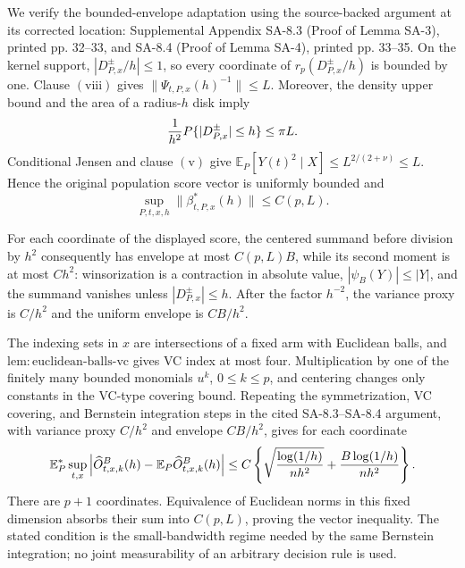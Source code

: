 We verify the bounded-envelope adaptation using the source-backed argument at its corrected location: Supplemental Appendix SA-8.3 (Proof of Lemma SA-3), printed pp. 32--33, and SA-8.4 (Proof of Lemma SA-4), printed pp. 33--35.  On the kernel support, \(|D^{\pm}_{P,x}/h|\leq1\), so every coordinate of \(r_p(D^{\pm}_{P,x}/h)\) is bounded by one.  Clause \(\mathrm{(viii)}\) gives \(\|\Psi_{t,P,x}(h)^{-1}\|\leq L\).  Moreover, the density upper bound and the area of a radius-\(h\) disk imply
\[
 {1\over h^2}P\{|D^{\pm}_{P,x}|\leq h\}\leq \pi L.
\]
Conditional Jensen and clause \(\mathrm{(v)}\) give \(\mathbb E_P[Y(t)^2\mid X]\leq L^{2/(2+\nu)}\leq L\).  Hence the original population score vector is uniformly bounded and
\[
 \sup_{P,t,x,h}\|\beta^*_{t,P,x}(h)\|\leq C(p,L).
\]

For each coordinate of the displayed score, the centered summand before division by \(h^2\) consequently has envelope at most \(C(p,L)B\), while its second moment is at most \(Ch^2\): winsorization is a contraction in absolute value, \(|\psi_B(Y)|\leq|Y|\), and the summand vanishes unless \(|D^{\pm}_{P,x}|\leq h\).  After the factor \(h^{-2}\), the variance proxy is \(C/h^2\) and the uniform envelope is \(CB/h^2\).

The indexing sets in \(x\) are intersections of a fixed arm with Euclidean balls, and \(\mathrm{lem:euclidean\text{-}balls\text{-}vc}\) gives VC index at most four.  Multiplication by one of the finitely many bounded monomials \(u^k\), \(0\leq k\leq p\), and centering changes only constants in the VC-type covering bound.  Repeating the symmetrization, VC covering, and Bernstein integration steps in the cited SA-8.3--SA-8.4 argument, with variance proxy \(C/h^2\) and envelope \(CB/h^2\), gives for each coordinate
\[
 \mathbb E_P^*\sup_{t,x}
 \left|\widehat O^B_{t,x,k}(h)-\mathbb E_P\widehat O^B_{t,x,k}(h)\right|
 \leq C\left\{
 \sqrt{{\log(1/h)\over nh^2}}+{B\log(1/h)\over nh^2}
 \right\}.
\]
There are \(p+1\) coordinates.  Equivalence of Euclidean norms in this fixed dimension absorbs their sum into \(C(p,L)\), proving the vector inequality.  The stated condition is the small-bandwidth regime needed by the same Bernstein integration; no joint measurability of an arbitrary decision rule is used.